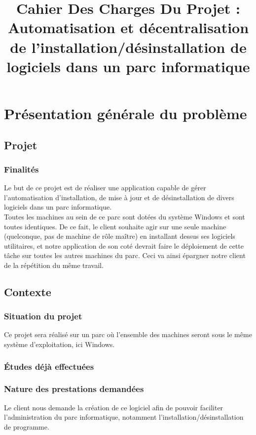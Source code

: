\documentclass[11pt]{article}
\title{\begin{center}\hspace{1.5cm}Cahier Des Charges Du Projet : \newline
              \newline
               \newline
 \textbf{ Automatisation et décentralisation de l'installation/désinstallation de logiciels dans un parc informatique} 
  \end{center}}
\begin{document}
\maketitle

\newpage

\tableofcontents
 \newpage
\section{Présentation générale du problème}

\subsection{Projet}
  \subsubsection{Finalités} 
Le but de ce projet est de réaliser une application capable de gérer l'automatisation d'installation, de mise à jour et de désinstallation de divers logiciels dans un parc informatique. \\
Toutes les machines au sein de ce parc sont dotées du système Windows et sont toutes identiques. De ce fait, le client souhaite agir sur une seule machine (quelconque, pas de machine de rôle maître) en installant dessus ses logiciels utilitaires, et notre application de son coté devrait faire le déploiement de cette tâche sur toutes les autres machines du parc. Ceci va ainsi épargner notre client de la répétition du même travail.   
  
\subsection{Contexte}
  \subsubsection{Situation du projet}
    Ce projet sera réalisé sur un parc où l'ensemble des machines seront sous le même système d'exploitation, ici Windows.
  \subsubsection{Études déjà effectuées}

  \subsubsection{Nature des prestations demandées}
  Le client nous demande la création de ce logiciel afin de pouvoir faciliter l'administration du parc informatique, notamment l'installation/désinstallation de programme.
\end{document}
